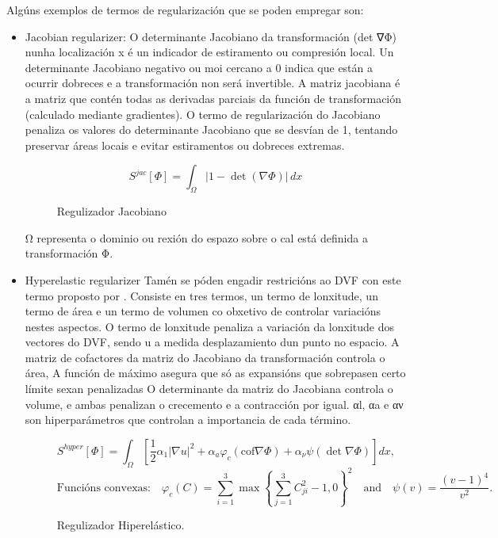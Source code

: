 Algúns exemplos de termos de regularización que se poden empregar son:
\begin{itemize}
    \item Jacobian regularizer: 
    O determinante Jacobiano da transformación (det ∇Φ) nunha localización x é un indicador de estiramento ou compresión local.
    Un determinante Jacobiano negativo ou moi cercano a 0 indica que están a ocurrir dobreces e a transformación non será invertible.
    A matriz jacobiana é a matriz que contén todas as derivadas parciais da función de transformación (calculado mediante gradientes).
    O termo de regularización do Jacobiano penaliza os valores do determinante Jacobiano que se desvían de 1, 
    tentando preservar áreas locais e evitar estiramentos ou dobreces extremas.


    \begin{figure}[ht!]
        \centering
        \[
        S^{jac}[\Phi] = \int_{\Omega} \left| 1 - \det \left( \nabla \Phi \right) \right| \, dx
        \]
        \caption{Regulizador Jacobiano}
    \end{figure}

    Ω representa o dominio ou rexión do espazo sobre o cal está definida a transformación Φ.
    
    \item Hyperelastic regularizer
    Tamén se póden engadir restricións ao DVF con este termo proposto por \cite{HyperelasticRegularization}.
    Consiste en tres termos, un termo de lonxitude, un termo de área e un termo de volumen co obxetivo de controlar variacións nestes aspectos.
    O termo de lonxitude penaliza a variación da lonxitude dos vectores do DVF, sendo u a medida desplazamiento dun punto no espacio.
    A matriz de cofactores da matriz do Jacobiano da transformación controla o área, 
    A función de máximo asegura que só as expansións que sobrepasen certo límite sexan penalizadas
    O determinante da matriz do Jacobiana controla o volume, 
    e ambas penalizan o crecemento e a contracción por igual.
    αl, αa e αν son hiperparámetros que controlan a importancia de cada término.

    \begin{figure}[ht!]
        \centering
        \[
        S^{hyper}[\Phi] = \int_{\Omega} \left[ \frac{1}{2} \alpha_1 |\nabla u|^2 + \alpha_a \varphi_c (\text{cof} \nabla \Phi) + \alpha_\nu \psi(\det \nabla \Phi) \right] dx,
        \]
        \[
        \text{Funcións convexas:} \quad \varphi_c(C) = \sum_{i=1}^3 \max \left\{ \sum_{j=1}^3 C_{ji}^2 - 1, 0 \right\}^2 \quad \text{and} \quad \psi(v) = \frac{(v-1)^4}{v^2}.
        \]
        \caption{Regulizador Hiperelástico.}
    \end{figure}



\end{itemize}
